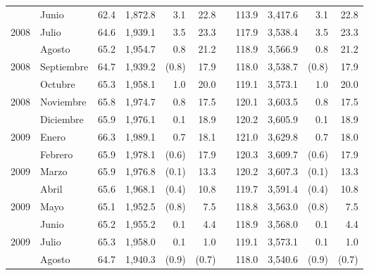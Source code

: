 \begin{center}
\begin{longtable}{llrrrrrrrrr}
		\rowcolor{color1!5!white}\multicolumn{1}{l}{	2008	}&	Junio	&	 62.4 	&	 1,872.8 	&	 3.1 	&	 22.8 	&  &	 113.9 	&	 3,417.6 	&	 3.1 	&	 22.8 	\\
		\multicolumn{1}{l}{	2008	}&	Julio	&	 64.6 	&	 1,939.1 	&	 3.5 	&	 23.3 	&  &	 117.9 	&	 3,538.4 	&	 3.5 	&	 23.3 	\\
		\rowcolor{color1!5!white}\multicolumn{1}{l}{	2008	}&	Agosto	&	 65.2 	&	 1,954.7 	&	 0.8 	&	 21.2 	&  &	 118.9 	&	 3,566.9 	&	 0.8 	&	 21.2 	\\
		\multicolumn{1}{l}{	2008	}&	Septiembre	&	 64.7 	&	 1,939.2 	&	 (0.8)	&	 17.9 	&  &	 118.0 	&	 3,538.7 	&	 (0.8)	&	 17.9 	\\
		\rowcolor{color1!5!white}\multicolumn{1}{l}{	2008	}&	Octubre	&	 65.3 	&	 1,958.1 	&	 1.0 	&	 20.0 	&  &	 119.1 	&	 3,573.1 	&	 1.0 	&	 20.0 	\\
		\multicolumn{1}{l}{	2008	}&	Noviembre	&	 65.8 	&	 1,974.7 	&	 0.8 	&	 17.5 	&  &	 120.1 	&	 3,603.5 	&	 0.8 	&	 17.5 	\\
		\rowcolor{color1!5!white}\multicolumn{1}{l}{	2008	}&	Diciembre	&	 65.9 	&	 1,976.1 	&	 0.1 	&	 18.9 	&  &	 120.2 	&	 3,605.9 	&	 0.1 	&	 18.9 	\\
		\multicolumn{1}{l}{	2009	}&	Enero	&	 66.3 	&	 1,989.1 	&	 0.7 	&	 18.1 	&  &	 121.0 	&	 3,629.8 	&	 0.7 	&	 18.0 	\\
		\rowcolor{color1!5!white}\multicolumn{1}{l}{	2009	}&	Febrero	&	 65.9 	&	 1,978.1 	&	 (0.6)	&	 17.9 	&  &	 120.3 	&	 3,609.7 	&	 (0.6)	&	 17.9 	\\
		\multicolumn{1}{l}{	2009	}&	Marzo	&	 65.9 	&	 1,976.8 	&	 (0.1)	&	 13.3 	&  &	 120.2 	&	 3,607.3 	&	 (0.1)	&	 13.3 	\\
		\rowcolor{color1!5!white}\multicolumn{1}{l}{	2009	}&	Abril	&	 65.6 	&	 1,968.1 	&	 (0.4)	&	 10.8 	&  &	 119.7 	&	 3,591.4 	&	 (0.4)	&	 10.8 	\\
		\multicolumn{1}{l}{	2009	}&	Mayo	&	 65.1 	&	 1,952.5 	&	 (0.8)	&	 7.5 	&  &	 118.8 	&	 3,563.0 	&	 (0.8)	&	 7.5 	\\
		\rowcolor{color1!5!white}\multicolumn{1}{l}{	2009	}&	Junio	&	 65.2 	&	 1,955.2 	&	 0.1 	&	 4.4 	&  &	 118.9 	&	 3,568.0 	&	 0.1 	&	 4.4 	\\
		\multicolumn{1}{l}{	2009	}&	Julio	&	 65.3 	&	 1,958.0 	&	 0.1 	&	 1.0 	&  &	 119.1 	&	 3,573.1 	&	 0.1 	&	 1.0 	\\
		\rowcolor{color1!5!white}\multicolumn{1}{l}{	2009	}&	Agosto	&	 64.7 	&	 1,940.3 	&	 (0.9)	&	 (0.7)	&  &	 118.0 	&	 3,540.6 	&	 (0.9)	&	 (0.7)	\\

\end{longtable}
\end{center}
